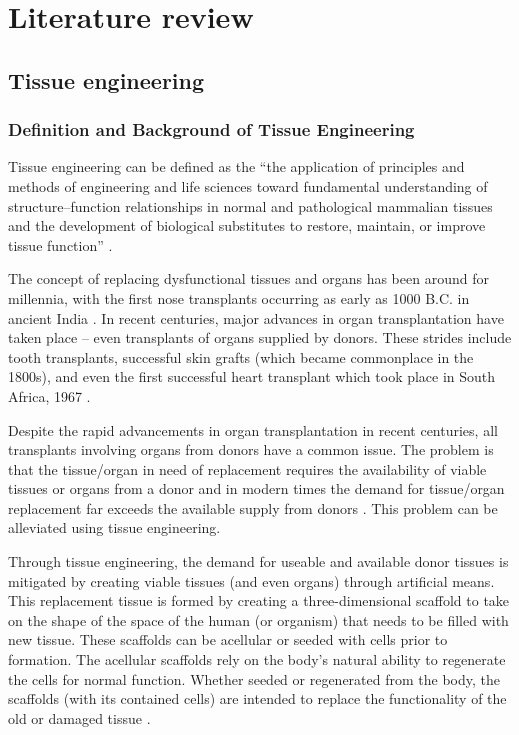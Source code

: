 \chapter{Literature review}

\section{Tissue engineering}
\subsection{Definition and Background of Tissue Engineering}
Tissue engineering can be defined as the “the application of principles and methods of engineering and life sciences toward fundamental understanding of structure–function relationships in normal and pathological mammalian tissues and the development of biological substitutes to restore, maintain, or improve tissue function” \citep{skalak_1988}.

The concept of replacing dysfunctional tissues and organs has been around for millennia, with the first nose transplants occurring as early as 1000 B.C. in ancient India \citep{saltzman_2004}. In recent centuries, major advances in organ transplantation have taken place – even transplants of organs supplied by donors. These strides include tooth transplants, successful skin grafts (which became commonplace in the 1800s), and even the first successful heart transplant which took place in South Africa, 1967 \citep{saltzman_2004}.

Despite the rapid advancements in organ transplantation in recent centuries, all transplants involving organs from donors have a common issue. The problem is that the tissue/organ in need of replacement requires the availability of viable tissues or organs from a donor and in modern times the demand for tissue/organ replacement far exceeds the available supply from donors \citep{saltzman_2004}. This problem can be alleviated using tissue engineering. 

Through tissue engineering, the demand for useable and available donor tissues is mitigated by creating viable tissues (and even organs) through artificial means. This replacement tissue is formed by creating a three-dimensional scaffold to take on the shape of the space of the human (or organism) that needs to be filled with new tissue. These scaffolds can be acellular or seeded with cells prior to formation. The acellular scaffolds rely on the body’s natural ability to regenerate the cells for normal function. Whether seeded or regenerated from the body, the scaffolds (with its contained cells) are intended to replace the functionality of the old or damaged tissue \citep{olson_2011}.

